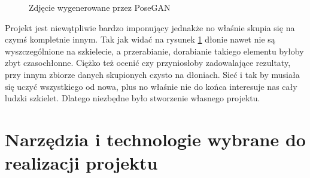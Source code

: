 \documentclass[12pt]{article}
\begin{document}
\begin{sloppypar}
{{\begin{figure}[H]
      \caption{Zdjęcie wygenerowane przez PoseGAN \cite{pose-gan}}
      \label{fig:pose-gan-przyklady}
    \end{figure}
    Projekt jest niewątpliwie bardzo imponujący jednakże no właśnie skupia się na czymś kompletnie innym. 
    Tak jak widać na rysunek \ref{fig:pose-gan-przyklady} dłonie nawet nie są wyszczególnione na szkielecie, a przerabianie, dorabianie takiego elementu byłoby zbyt czasochłonne. 
    Ciężko też ocenić czy przyniosłoby zadowalające rezultaty, przy innym zbiorze danych skupionych czysto na dłoniach.
    Sieć i tak by musiała się uczyć wszystkiego od nowa, plus no właśnie nie do końca interesuje nas cały ludzki szkielet. Dlatego niezbędne było stworzenie własnego projektu.
  }
}

\section{Narzędzia i technologie wybrane do realizacji projektu}
{
}
\end{sloppypar}
\end{document}
